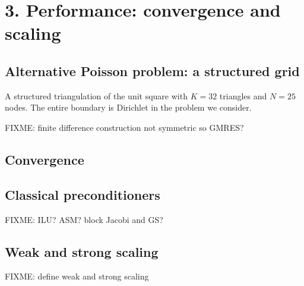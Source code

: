 
\chapter{3. Performance: convergence and scaling}

\section{Alternative Poisson problem: a structured grid}


\begin{marginfigure}

\caption{A structured triangulation of the unit square with $K=32$ triangles and $N=25$ nodes.  The entire boundary is Dirichlet in the problem we consider.}
\label{fig:structuredfem}
\end{marginfigure}

FIXME: finite difference construction not symmetric so GMRES?


\section{Convergence}

\section{Classical preconditioners}

FIXME:  ILU?  ASM?  block Jacobi and GS?

\section{Weak and strong scaling}

FIXME: define weak and strong scaling

